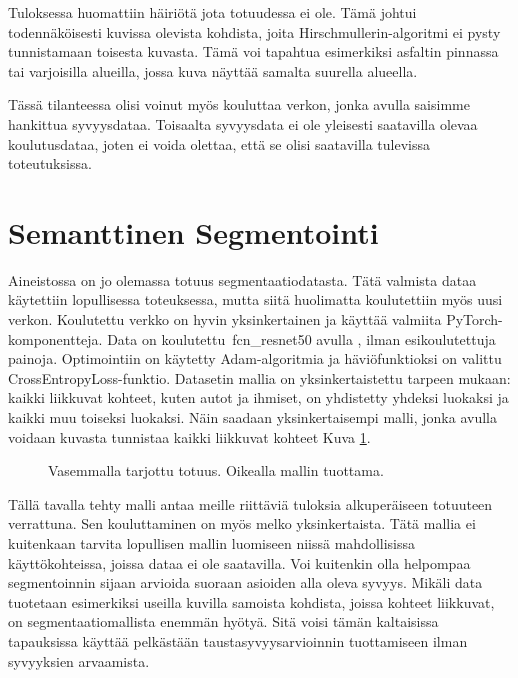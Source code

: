 Tuloksessa huomattiin häiriötä jota totuudessa ei ole.
Tämä johtui todennäköisesti kuvissa olevista kohdista, joita Hirschmullerin-algoritmi ei pysty tunnistamaan toisesta kuvasta.
Tämä voi tapahtua esimerkiksi asfaltin pinnassa tai varjoisilla alueilla, jossa kuva näyttää samalta suurella alueella.

Tässä tilanteessa olisi voinut myös kouluttaa verkon, jonka avulla saisimme hankittua syvyysdataa.
Toisaalta syvyysdata ei ole yleisesti saatavilla olevaa koulutusdataa,
joten ei voida olettaa, että se olisi saatavilla tulevissa toteutuksissa. 

\section{Semanttinen Segmentointi}

Aineistossa on jo olemassa totuus segmentaatiodatasta.
Tätä valmista dataa käytettiin lopullisessa toteuksessa, mutta siitä huolimatta koulutettiin myös uusi verkon.
Koulutettu verkko on hyvin yksinkertainen ja käyttää valmiita PyTorch-komponentteja.
Data on koulutettu\ fcn\_resnet50 avulla \cite{pytorchfcnresnet50}, ilman esikoulutettuja painoja. Optimointiin on käytetty Adam-algoritmia ja häviöfunktioksi on valittu CrossEntropyLoss-funktio.
Datasetin mallia on yksinkertaistettu tarpeen mukaan: kaikki liikkuvat kohteet, kuten autot ja ihmiset, on yhdistetty yhdeksi luokaksi ja kaikki muu toiseksi luokaksi.
Näin saadaan yksinkertaisempi malli, jonka avulla voidaan kuvasta tunnistaa kaikki liikkuvat kohteet Kuva \ref{fig:segmentation1}.

\begin{figure}[h]
\centering
{}
\caption[Tämä on lyhyt kuvateksti.]{Vasemmalla tarjottu totuus. Oikealla mallin tuottama.}
\label{fig:segmentation1}
\end{figure}


Tällä tavalla tehty malli antaa meille riittäviä tuloksia alkuperäiseen totuuteen verrattuna.
Sen kouluttaminen on myös melko yksinkertaista.
Tätä mallia ei kuitenkaan tarvita lopullisen mallin luomiseen niissä mahdollisissa käyttökohteissa, joissa dataa ei ole saatavilla.
Voi kuitenkin olla helpompaa segmentoinnin sijaan arvioida suoraan asioiden alla oleva syvyys.
Mikäli data tuotetaan esimerkiksi useilla kuvilla samoista kohdista, joissa kohteet liikkuvat,
on segmentaatiomallista enemmän hyötyä.
Sitä voisi tämän kaltaisissa tapauksissa käyttää pelkästään taustasyvyysarvioinnin tuottamiseen ilman syvyyksien arvaamista.

